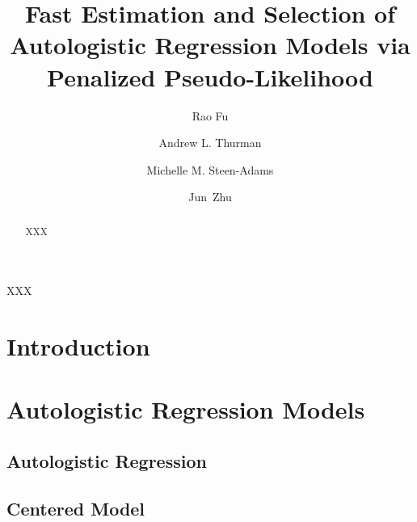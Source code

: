 \documentclass[authoryear,review, 11pt]{elsarticle}
\begin{document}
\begin{frontmatter}

\title{Fast Estimation and Selection of Autologistic Regression Models via Penalized Pseudo-Likelihood}

\author[rfu]{Rao Fu}

\author[athurman]{Andrew L. Thurman}


\author[msteen]{Michelle M. Steen-Adams}

\author[jzhu]{Jun~Zhu}

\address[rfu]{Department of Statistics, University of Wisconsin at Madison, Madison, WI 53706}
\address[athurman]{Department of Statistics, University of Wisconsin at Madison, Madison, WI 53706}
\address[msteen]{Department of Environmental Studies, University of New England, Biddeford, ME 04005}
\address[jzhu]{Department of Statistics and Department of Entomology, University of Wisconsin at Madison, Madison, WI 53706}

\begin{abstract}
XXX
\end{abstract}

\begin{keyword}
XXX
\end{keyword}

\end{frontmatter}

%
%
\section{Introduction}
\label{sec:intro}
 
%
%
\section{Autologistic Regression Models} 
\label{sec:model}

\subsection{Autologistic Regression}
\label{subsec:model:reg}

\subsection{Centered Model}
\label{subsec:model:regCenter}
\end{document}

